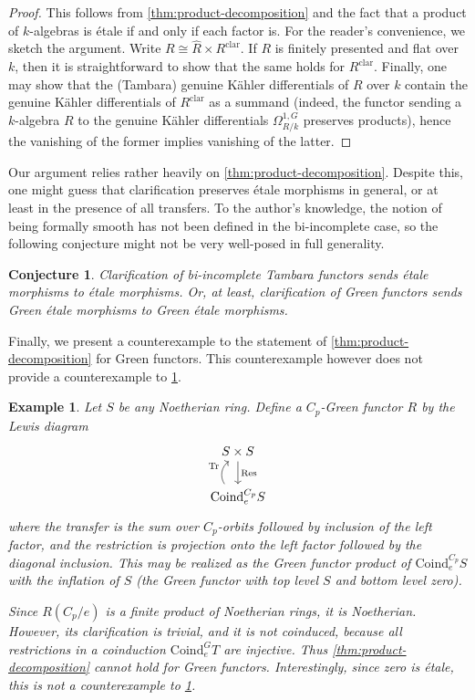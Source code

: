 \documentclass[11pt,dvipsnames]{amsart}
\theoremstyle{BoldRemark}
\newtheorem{example}[theorem]{Example}
\newtheorem{conjecture}[theorem]{Conjecture}
\begin{document}
\begin{proof}
	This follows from \cref{thm:product-decomposition} and the fact that a product of $k$-algebras is \'{e}tale if and only if each factor is. For the reader's convenience, we sketch the argument. Write $R \cong \widehat{R} \times R^{\mathrm{clar}}$. If $R$ is finitely presented and flat over $k$, then it is straightforward to show that the same holds for $R^{\mathrm{clar}}$. Finally, one may show that the (Tambara) genuine K\"{a}hler differentials of $R$ over $k$ contain the genuine K\"{a}hler differentials of $R^{\mathrm{clar}}$ as a summand (indeed, the functor sending a $k$-algebra $R$ to the genuine K\"{a}hler differentials $\Omega^{1,G}_{R/k}$ preserves products), hence the vanishing of the former implies vanishing of the latter.
\end{proof}

Our argument relies rather heavily on \cref{thm:product-decomposition}. Despite this, one might guess that clarification preserves \'{e}tale morphisms in general, or at least in the presence of all transfers. To the author's knowledge, the notion of being formally smooth has not been defined in the bi-incomplete case, so the following conjecture might not be very well-posed in full generality.

\begin{conjecture}\label{conj:clar-preserves-etale-of-bi-incomplete}
	Clarification of bi-incomplete Tambara functors sends \'{e}tale morphisms to \'{e}tale morphisms. Or, at least, clarification of Green functors sends Green \'{e}tale morphisms to Green \'{e}tale morphisms.
\end{conjecture}

Finally, we present a counterexample to the statement of \cref{thm:product-decomposition} for Green functors. This counterexample however does not provide a counterexample to \cref{conj:clar-preserves-etale-of-bi-incomplete}.

\begin{example}\label{ex:product-splitting-fails-for-Green-functors}
	Let $S$ be any Noetherian ring. Define a $C_p$-Green functor $R$ by the Lewis diagram
\[ \begin{tikzcd}
	S \times S \arrow[d, "\mathrm{Res}"] \\
	\mathrm{Coind}_e^{C_p} S \arrow[u, bend left = 45, "\mathrm{Tr}"]
\end{tikzcd} \] 
where the transfer is the sum over $C_p$-orbits followed by inclusion of the left factor, and the restriction is projection onto the left factor followed by the diagonal inclusion. This may be realized as the Green functor product of $\mathrm{Coind}_e^{C_p} S$ with the inflation of $S$ (the Green functor with top level $S$ and bottom level zero).
	
	Since $R(C_p/e)$ is a finite product of Noetherian rings, it is Noetherian. However, its clarification is trivial, and it is not coinduced, because all restrictions in a coinduction $\mathrm{Coind}_e^G T$ are injective. Thus \cref{thm:product-decomposition} cannot hold for Green functors. Interestingly, since zero is \'{e}tale, this is not a counterexample to \cref{conj:clar-preserves-etale-of-bi-incomplete}.
\end{example}
\end{document}
